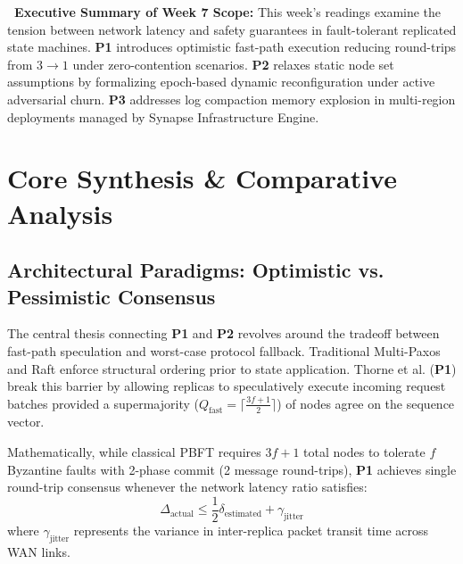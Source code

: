 \documentclass[11pt, a4paper, english]{scrartcl}
\begin{document}
\begin{tcolorbox}[takeawaybox]
\sffamily\small
\textbf{\faLightbulb\ Executive Summary of Week 7 Scope:}
This week's readings examine the tension between network latency and safety guarantees in fault-tolerant replicated state machines. \textbf{\lbrack P1\rbrack} introduces optimistic fast-path execution reducing round-trips from $3 \rightarrow 1$ under zero-contention scenarios. \textbf{\lbrack P2\rbrack} relaxes static node set assumptions by formalizing epoch-based dynamic reconfiguration under active adversarial churn. \textbf{\lbrack P3\rbrack} addresses log compaction memory explosion in multi-region deployments managed by Synapse Infrastructure Engine.
\end{tcolorbox}

\section{Core Synthesis \& Comparative Analysis}

\subsection{Architectural Paradigms: Optimistic vs. Pessimistic Consensus}

The central thesis connecting \textbf{\lbrack P1\rbrack} and \textbf{\lbrack P2\rbrack} revolves around the tradeoff between fast-path speculation and worst-case protocol fallback. Traditional Multi-Paxos and Raft enforce structural ordering prior to state application. Thorne et al. (\textbf{\lbrack P1\rbrack}) break this barrier by allowing replicas to speculatively execute incoming request batches provided a supermajority ($Q_{\text{fast}} = \lceil \frac{3f+1}{2} \rceil$) of nodes agree on the sequence vector.

Mathematically, while classical PBFT requires $3f+1$ total nodes to tolerate $f$ Byzantine faults with 2-phase commit (2 message round-trips), \textbf{\lbrack P1\rbrack} achieves single round-trip consensus whenever the network latency ratio satisfies:
\begin{equation}
  \Delta_{\text{actual}} \le \frac{1}{2} \delta_{\text{estimated}} + \gamma_{\text{jitter}}
\end{equation}
where $\gamma_{\text{jitter}}$ represents the variance in inter-replica packet transit time across WAN links.
\end{document}
